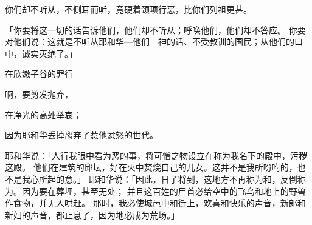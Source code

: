 {你们却不听从，不侧耳而听，竟硬着颈项行恶，比你们列祖更甚。
\par }{\PP {}「你要将这一切的话告诉他们，他们却不听从；呼唤他们，他们却不答应。
你要对他们说：这就是不听从耶和华—他们　神的话、不受教训的国民；从他们的口中，诚实灭绝了。」
\par }{\SH 在欣嫩子谷的罪行
\par }{\Q {}啊，要剪发抛弃，
\par }{\Q 在净光的高处举哀；
\par }{\Q 因为耶和华丢掉离弃了惹他忿怒的世代。
\par }{\PP {}耶和华说：「{}人行我眼中看为恶的事，将可憎之物设立在称为我名下的殿中，污秽这殿。
他们在{}建筑{}的邱坛，好在火中焚烧自己的儿女。这并不是我所吩咐的，也不是我心所起的意。」
耶和华说：「因此，日子将到，这地方不再称为{}和{}，反倒称为{}。因为要在{}葬埋{}，甚至无处{}；
并且这百姓的尸首必给空中的飞鸟和地上的野兽作食物，并无人哄赶。
那时，我必使{}城邑中和{}街上，欢喜和快乐的声音，新郎和新妇的声音，都止息了，因为地必成为荒场。」

}
